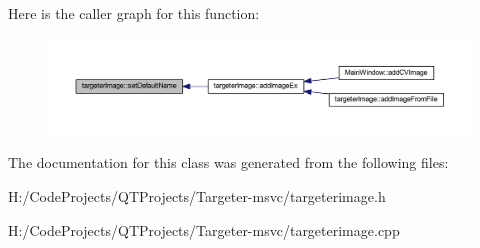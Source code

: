 Here is the caller graph for this function\+:
\nopagebreak
\begin{figure}[H]
\begin{center}
\leavevmode
\includegraphics[width=350pt]{classtargeter_image_a47b6c3edc2c1854523e6f14504a64883_icgraph}
\end{center}
\end{figure}


The documentation for this class was generated from the following files\+:\begin{DoxyCompactItemize}
\item 
H\+:/\+Code\+Projects/\+Q\+T\+Projects/\+Targeter-\/msvc/targeterimage.\+h\item 
H\+:/\+Code\+Projects/\+Q\+T\+Projects/\+Targeter-\/msvc/targeterimage.\+cpp\end{DoxyCompactItemize}
